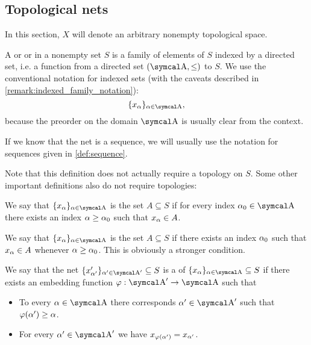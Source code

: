 \subsection{Topological nets}\label{subsec:topological_nets}

In this section, \( X \) will denote an arbitrary nonempty topological space.

\begin{definition}\label{def:topological_net}
  A  or  or  in a nonempty set \( S \) is a family of elements of \( S \) indexed by a directed set, i.e. a function from a directed set \( (\CA, \leq) \) to \( S \). We use the conventional notation for indexed sets (with the caveats described in \cref{remark:indexed_family_notation}):
  \begin{equation*}
    \{ x_\al \}_{\al \in \CA},
  \end{equation*}
  because the preorder on the domain \( \CA \) is usually clear from the context.

  If we know that the net is a sequence, we will usually use the notation for sequences given in \cref{def:sequence}.

  Note that this definition does not actually require a topology on \( S \). Some other important definitions also do not require topologies:
  \begin{defenum}
     We say that \( \{ x_\al \}_{\al \in \CA} \) is  the set \( A \subseteq S \) if for every index \( \al_0 \in \CA \) there exists an index \( \alpha \geq \alpha_0 \) such that \( x_\alpha \in A \).

     We say that \( \{ x_\al \}_{\al \in \CA} \) is  the set \( A \subseteq S \) if there exists an index \( \alpha_0 \) such that \( x_\alpha \in A \) whenever \( \alpha \geq \alpha_0 \). This is obviously a stronger condition.

    \cite[50]{Engelking1989} We say that the net \( \{ x'_{\al'} \}_{\al' \in \CA'} \subseteq S \) is a  of \( \{ x_\al \}_{\al \in \CA} \subseteq S \) if there exists an embedding function \( \varphi: \CA' \to \CA \) such that
    \begin{itemize}
      \item To every \( \al \in \CA \) there corresponds \( \al' \in \CA' \) such that \( \varphi(\alpha') \geq \alpha \).
      \item For every \( \al' \in \CA' \) we have \( x_{\varphi(\alpha')} = x_{\alpha'} \).
    \end{itemize}
  \end{defenum}
\end{definition}

